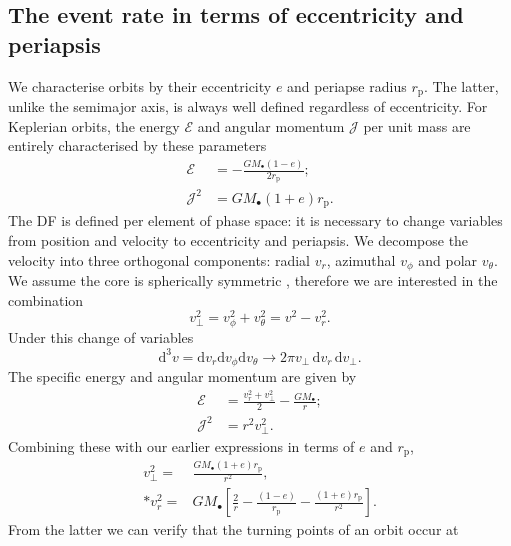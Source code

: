 \documentclass[useAMS,usedcolumn,usegraphicx,usenatbib]{mn2e}
\newcommand{\sub}[1]{\ensuremath{_\mathrm{#1}}}
\newcommand{\dd}{\ensuremath{\mathrm{d}}}
\begin{document}
\subsection{The event rate in terms of eccentricity and periapsis}\label{sec:e-rp}

We characterise orbits by their eccentricity $e$ and periapse radius $r\sub{p}$. The latter, unlike the semimajor axis, is always well defined regardless of eccentricity. For Keplerian orbits, the energy $\mathcal{E}$ and angular momentum $\mathcal{J}$ per unit mass are entirely characterised by these parameters
\begin{equation}
\label{eq:Energy_ecc}
\begin{split}
\mathcal{E} & = -\frac{GM_\bullet(1 - e)}{2r\sub{p}}; \\
\mathcal{J}^2 & = GM_\bullet(1 + e)r\sub{p}.
\end{split}
\end{equation}
The DF is defined per element of phase space: it is necessary to change variables from position and velocity to eccentricity and periapsis. We decompose the velocity into three orthogonal components: radial $v_r$, azimuthal $v_\phi$ and polar $v_\theta$. We assume the core is spherically symmetric \citep{Genzel2003, Schodel2007}, therefore we are interested in the combination
\begin{equation}
v_\perp^2 = v_\phi^2 + v_\theta^2 = v^2 - v_r^2.
\end{equation}
Under this change of variables
\begin{equation}
\dd^3v = \dd v_r \dd v_\phi \dd v_\theta \rightarrow 2\pi v_\perp \,\dd v_r \,\dd v_\perp.
\end{equation}
The specific energy and angular momentum are given by
\begin{equation}
\begin{split}
\mathcal{E} & = \frac{v_r^2 + v_\perp^2}{2} - \frac{GM_\bullet}{r}; \\
\mathcal{J}^2 & = r^2 v_\perp^2.
\end{split}
\end{equation}
Combining these with our earlier expressions in terms of $e$ and $r\sub{p}$,
\begin{align}
v_\perp^2 = {} & \frac{GM_\bullet(1 + e)r\sub{p}}{r^2}, \\*
v_r^2 = {} & GM_\bullet\left[\frac{2}{r} - \frac{(1 - e)}{r\sub{p}} - \frac{(1 + e)r\sub{p}}{r^2}\right].
\end{align}
From the latter we can verify that the turning points of an orbit occur at
\end{document}
